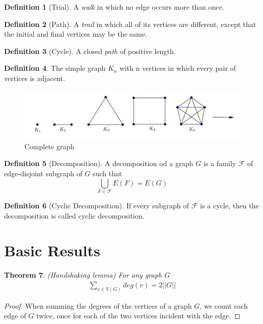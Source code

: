 \documentclass[	DIV=calc,%
							paper=a4,%
							fontsize=11pt,%
							twocolumn]{scrartcl}	 					%
\newtheorem{thm}{Theorem}[section]
\theoremstyle{definition}
\newtheorem{defn}[thm]{Definition}
\theoremstyle{plain}
\theoremstyle{remark}
\begin{document}
\begin{defn}[Trial]
A \textit{walk} in which no edge occurs more than once.
\end{defn}

\begin{defn}[Path]
A \textit{trail} in which all of its vertices are different, except that the initial and final vertices may be the same.
\end{defn}

\begin{defn}[Cycle]
A closed \textit{path} of positive length.
\end{defn}

\begin{defn}
The simple graph $K_n$ with n vertices in which every pair of vertices is adjacent.
\end{defn}

\begin{figure}[hbt!]
\centering
\includegraphics[width=.5\textwidth]{completegraph.png}
\caption{Complete graph}\label{fig3}
\end{figure}

\begin{defn}[Decomposition] A decomposition od a graph $G$ is a family $\mathcal{F}$ of edge-disjoint subgraph of $G$ such that $$ \bigcup_{F\in \mathcal{F}}E(F) = E(G)$$

\end{defn}

\begin{defn}[Cyclic Decomposition]
If every subgraph of $\mathcal{F}$ is a cycle, then the decomposition is called cyclic decomposition.
\end{defn}

\section{Basic Results}

\begin{thm}(Handshaking lemma)
For any graph $G$
\begin{align}
\sum_{v\in V(G)}deg(v)=2||G||
\end{align}
\end{thm}

\begin{proof}
When summing the degrees of the vertices of a graph $G$, we count each edge of $G$ twice, once for each of the two vertices incident with the edge.
\end{proof}
\end{document}

